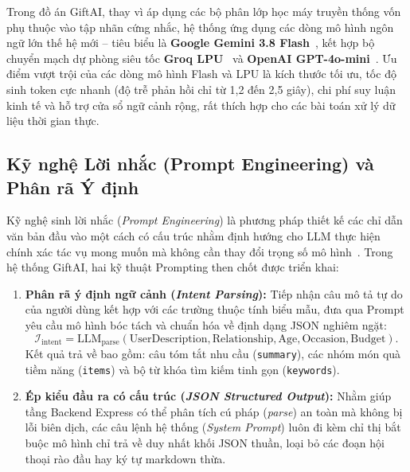 Trong đồ án GiftAI, thay vì áp dụng các bộ phân lớp học máy truyền thống vốn phụ thuộc vào tập nhãn cứng nhắc, hệ thống ứng dụng các dòng mô hình ngôn ngữ lớn thế hệ mới -- tiêu biểu là \textbf{Google Gemini 3.8 Flash}~\cite{gemini_team}, kết hợp bộ chuyển mạch dự phòng siêu tốc \textbf{Groq LPU}~\cite{groq_docs} và \textbf{OpenAI GPT-4o-mini}~\cite{openai_docs}. Ưu điểm vượt trội của các dòng mô hình Flash và LPU là kích thước tối ưu, tốc độ sinh token cực nhanh (độ trễ phản hồi chỉ từ 1,2 đến 2,5 giây), chi phí suy luận kinh tế và hỗ trợ cửa sổ ngữ cảnh rộng, rất thích hợp cho các bài toán xử lý dữ liệu thời gian thực.

\subsection{Kỹ nghệ Lời nhắc (Prompt Engineering) và Phân rã Ý định}

Kỹ nghệ sinh lời nhắc (\textit{Prompt Engineering}) là phương pháp thiết kế các chỉ dẫn văn bản đầu vào một cách có cấu trúc nhằm định hướng cho LLM thực hiện chính xác tác vụ mong muốn mà không cần thay đổi trọng số mô hình~\cite{prompt_wei}. Trong hệ thống GiftAI, hai kỹ thuật Prompting then chốt được triển khai:

\begin{enumerate}[leftmargin=1.2cm, itemsep=3pt]
    \item \textbf{Phân rã ý định ngữ cảnh (\textit{Intent Parsing}):} Tiếp nhận câu mô tả tự do của người dùng kết hợp với các trường thuộc tính biểu mẫu, đưa qua Prompt yêu cầu mô hình bóc tách và chuẩn hóa về định dạng JSON nghiêm ngặt:
    \begin{equation}
    \mathcal{I}_{\mathrm{intent}} = \mathrm{LLM}_{\mathrm{parse}}(\text{UserDescription}, \text{Relationship}, \text{Age}, \text{Occasion}, \text{Budget}).
    \end{equation}
    Kết quả trả về bao gồm: câu tóm tắt nhu cầu (\texttt{summary}), các nhóm món quà tiềm năng (\texttt{items}) và bộ từ khóa tìm kiếm tinh gọn (\texttt{keywords}).

    \item \textbf{Ép kiểu đầu ra có cấu trúc (\textit{JSON Structured Output}):} Nhằm giúp tầng Backend Express có thể phân tích cú pháp (\textit{parse}) an toàn mà không bị lỗi biên dịch, các câu lệnh hệ thống (\textit{System Prompt}) luôn đi kèm chỉ thị bắt buộc mô hình chỉ trả về duy nhất khối JSON thuần, loại bỏ các đoạn hội thoại rào đầu hay ký tự markdown thừa.
\end{enumerate}


